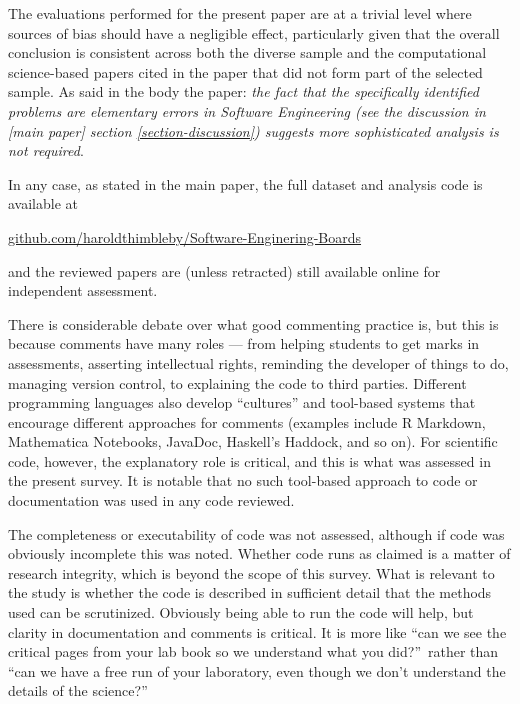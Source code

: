 \documentclass[10pt,a4paper]{article}
\begin{document}
The evaluations performed for the present paper are at a trivial level where sources of bias should have a negligible effect, particularly given that the overall conclusion is consistent across both the diverse sample and the computational science-based papers cited in the paper that did not form part of the selected sample. As said in the body the paper: \emph{the fact that the specifically identified problems are elementary errors in Software Engineering (see the discussion in \emph{[main paper]\/} section \ref{section-discussion}) suggests more sophisticated analysis is not required}. 

In any case, as stated in the main paper, the full dataset and analysis code is available at \begin{center}\url{github.com/haroldthimbleby/Software-Enginering-Boards}\end{center} and the reviewed papers are (unless retracted) still available online for independent assessment. %

There is considerable debate over what good commenting practice is, but this is because comments have many roles --- from helping students to get marks in assessments, asserting intellectual rights, reminding the developer of things to do, managing version control, to explaining the code to third parties. Different programming languages also develop ``cultures'' and tool-based systems that encourage different approaches for comments (examples include R Markdown, Mathematica Notebooks, JavaDoc, Haskell's Haddock, and so on). For scientific code, however, the explanatory role is critical, and this is what was assessed in the present survey. It is notable that no such tool-based approach to code or documentation was used in any code reviewed.

The completeness or executability of code was not assessed, although if code was obviously incomplete this was noted. Whether code runs as claimed is a matter of research integrity, which is beyond the scope of this survey. What is relevant to the study is whether the code is described in sufficient detail that the methods used can be scrutinized. Obviously being able to run the code will help, but clarity in documentation and comments is critical. It is more like ``can we see the critical pages from your lab book so we understand what you did?''\ rather than ``can we have a free run of your laboratory, even though we don't understand the details of the science?''
\end{document}
